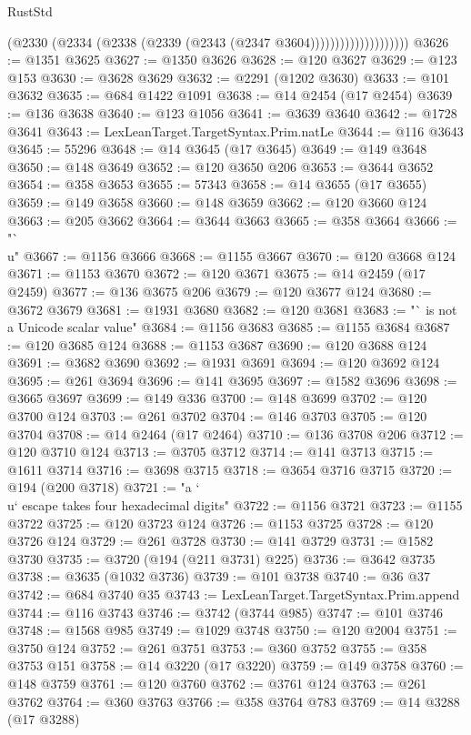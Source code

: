 \begin{lexlean}{RustStd}
\begin{coremodule}
                                (@2330 (@2334 (@2338 (@2339 (@2343 (@2347 @3604))))))))))))))))))))
@3626 := @1351 @3625
@3627 := @1350 @3626
@3628 := @120 @3627
@3629 := @123 @153
@3630 := @3628 @3629
@3632 := @2291 (@1202 @3630)
@3633 := @101 @3632
@3635 := @684 @1422 @1091
@3638 := @14 @2454 (@17 @2454)
@3639 := @136 @3638
@3640 := @123 @1056
@3641 := @3639 @3640
@3642 := @1728 @3641
@3643 := LexLeanTarget.TargetSyntax.Prim.natLe
@3644 := @116 @3643
@3645 := 55296
@3648 := @14 @3645 (@17 @3645)
@3649 := @149 @3648
@3650 := @148 @3649
@3652 := @120 @3650 @206
@3653 := @3644 @3652
@3654 := @358 @3653
@3655 := 57343
@3658 := @14 @3655 (@17 @3655)
@3659 := @149 @3658
@3660 := @148 @3659
@3662 := @120 @3660 @124
@3663 := @205 @3662
@3664 := @3644 @3663
@3665 := @358 @3664
@3666 := "`\\u"
@3667 := @1156 @3666
@3668 := @1155 @3667
@3670 := @120 @3668 @124
@3671 := @1153 @3670
@3672 := @120 @3671
@3675 := @14 @2459 (@17 @2459)
@3677 := @136 @3675 @206
@3679 := @120 @3677 @124
@3680 := @3672 @3679
@3681 := @1931 @3680
@3682 := @120 @3681
@3683 := "` is not a Unicode scalar value"
@3684 := @1156 @3683
@3685 := @1155 @3684
@3687 := @120 @3685 @124
@3688 := @1153 @3687
@3690 := @120 @3688 @124
@3691 := @3682 @3690
@3692 := @1931 @3691
@3694 := @120 @3692 @124
@3695 := @261 @3694
@3696 := @141 @3695
@3697 := @1582 @3696
@3698 := @3665 @3697
@3699 := @149 @336
@3700 := @148 @3699
@3702 := @120 @3700 @124
@3703 := @261 @3702
@3704 := @146 @3703
@3705 := @120 @3704
@3708 := @14 @2464 (@17 @2464)
@3710 := @136 @3708 @206
@3712 := @120 @3710 @124
@3713 := @3705 @3712
@3714 := @141 @3713
@3715 := @1611 @3714
@3716 := @3698 @3715
@3718 := @3654 @3716 @3715
@3720 := @194 (@200 @3718)
@3721 := "a `\\u` escape takes four hexadecimal digits"
@3722 := @1156 @3721
@3723 := @1155 @3722
@3725 := @120 @3723 @124
@3726 := @1153 @3725
@3728 := @120 @3726 @124
@3729 := @261 @3728
@3730 := @141 @3729
@3731 := @1582 @3730
@3735 := @3720 (@194 (@211 @3731) @225)
@3736 := @3642 @3735
@3738 := @3635 (@1032 @3736)
@3739 := @101 @3738
@3740 := @36 @37
@3742 := @684 @3740 @35
@3743 := LexLeanTarget.TargetSyntax.Prim.append
@3744 := @116 @3743
@3746 := @3742 (@3744 @985)
@3747 := @101 @3746
@3748 := @1568 @985
@3749 := @1029 @3748
@3750 := @120 @2004
@3751 := @3750 @124
@3752 := @261 @3751
@3753 := @360 @3752
@3755 := @358 @3753 @151
@3758 := @14 @3220 (@17 @3220)
@3759 := @149 @3758
@3760 := @148 @3759
@3761 := @120 @3760
@3762 := @3761 @124
@3763 := @261 @3762
@3764 := @360 @3763
@3766 := @358 @3764 @783
@3769 := @14 @3288 (@17 @3288)

\end{coremodule}
\end{lexlean}
